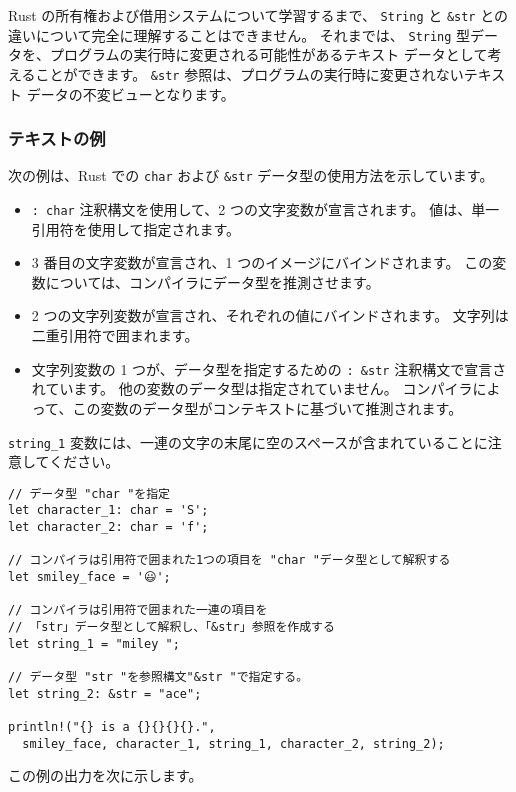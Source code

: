 Rust の所有権および借用システムについて学習するまで、 \texttt{String} と \texttt{\&str} との違いについて完全に理解することはできません。 それまでは、 \texttt{String} 型データを、プログラムの実行時に変更される可能性があるテキスト データとして考えることができます。 \texttt{\&str} 参照は、プログラムの実行時に変更されないテキスト データの不変ビューとなります。

\subsubsection{テキストの例}

次の例は、Rust での \texttt{char} および \texttt{\&str} データ型の使用方法を示しています。

\begin{itemize}
\item \texttt{: char} 注釈構文を使用して、2 つの文字変数が宣言されます。 値は、単一引用符を使用して指定されます。
\item 3 番目の文字変数が宣言され、1 つのイメージにバインドされます。 この変数については、コンパイラにデータ型を推測させます。
\item 2 つの文字列変数が宣言され、それぞれの値にバインドされます。 文字列は二重引用符で囲まれます。
\item 文字列変数の 1 つが、データ型を指定するための \texttt{: \&str} 注釈構文で宣言されています。 他の変数のデータ型は指定されていません。 コンパイラによって、この変数のデータ型がコンテキストに基づいて推測されます。
\end{itemize}

\texttt{string\_1} 変数には、一連の文字の末尾に空のスペースが含まれていることに注意してください。

\begin{lstlisting}[numbers=none]
// データ型 "char "を指定
let character_1: char = 'S';
let character_2: char = 'f';
   
// コンパイラは引用符で囲まれた1つの項目を "char "データ型として解釈する
let smiley_face = '😃';

// コンパイラは引用符で囲まれた一連の項目を
// 「str」データ型として解釈し、「&str」参照を作成する
let string_1 = "miley ";

// データ型 "str "を参照構文"&str "で指定する。
let string_2: &str = "ace";

println!("{} is a {}{}{}{}.", 
  smiley_face, character_1, string_1, character_2, string_2);
\end{lstlisting}

この例の出力を次に示します。


